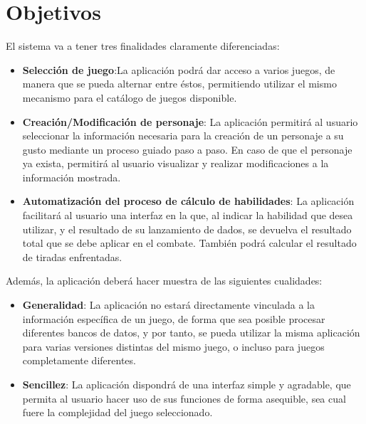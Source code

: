 \section{Objetivos}
El sistema va a tener tres finalidades claramente diferenciadas:
\begin{itemize}

    \item \textbf{Selección de juego}:La aplicación podrá dar 
    acceso a varios juegos, de manera que se pueda alternar 
    entre éstos, permitiendo utilizar el mismo mecanismo para 
    el catálogo de juegos disponible.

    \item \textbf{Creación/Modificación de personaje}: La 
    aplicación permitirá al usuario seleccionar la información
    necesaria para la creación de un personaje a su gusto 
    mediante un proceso guiado paso a paso. En caso de que el 
    personaje ya exista, permitirá al usuario visualizar y realizar 
    modificaciones a la información mostrada.

    \item \textbf{Automatización del proceso de cálculo 
    de habilidades}: La aplicación facilitará al usuario una 
    interfaz en la que, al indicar la habilidad que desea 
    utilizar, y el resultado de su lanzamiento de dados, se 
    devuelva el resultado total que se debe aplicar en el 
    combate. También podrá calcular el resultado de tiradas 
    enfrentadas.

\end{itemize}

Además, la aplicación deberá hacer muestra de las siguientes 
cualidades: 
\begin{itemize}

    \item \textbf{Generalidad}: La aplicación no estará directamente 
    vinculada a la información específica de un juego, de forma que 
    sea posible procesar diferentes bancos de datos, y por tanto, 
    se pueda utilizar la misma aplicación para varias versiones 
    distintas del mismo juego, o incluso para juegos completamente 
    diferentes.

    \item \textbf{Sencillez}: La aplicación dispondrá de una interfaz 
    simple y agradable, que permita al usuario hacer uso de sus 
    funciones de forma asequible, sea cual fuere la complejidad del 
    juego seleccionado.

\end{itemize}


